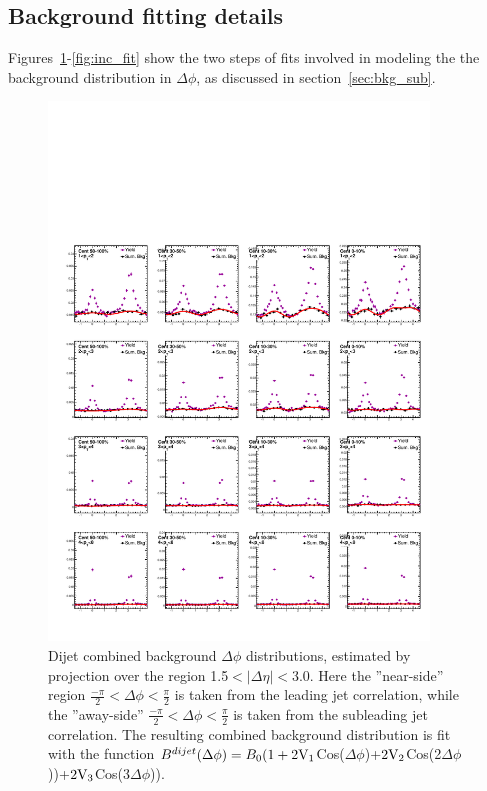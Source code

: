 \clearpage




\subsection{Background fitting details}

\label{app:bkg_fits}

Figures~\ref{fig:dijet_fit}-\ref{fig:inc_fit} show the two steps of fits involved in modeling the the background distribution in $\Delta\phi$, as discussed in section~\ref{sec:bkg_sub}.

\begin{figure}[h!]
\begin{center}
\includegraphics[width=0.9\textwidth]{figures/Appendices/DijetFreeFitsGluedBackgroundV1V2V3.pdf}
\caption[Dijet background fits (preliminary step)]{Dijet combined background $\Delta\phi$ distributions, estimated by projection over the region 1.5$<|\Delta\eta|<$3.0.  Here the ''near-side'' region $\frac{-\pi}{2}<\Delta\phi<\frac{\pi}{2}$ is taken from the leading jet correlation, while the ''away-side'' $\frac{-\pi}{2}<\Delta\phi<\frac{\pi}{2}$ is taken from the subleading jet correlation.  The resulting combined background distribution is fit with the function $B^{dijet}(\Delta\phi) = B_{0}(1+2\rm{V}_{1}$Cos($\Delta\phi$)+$2\rm{V}_{2}$Cos(2$\Delta\phi$))+$2\rm{V}_{3}$Cos(3$\Delta\phi$)).}
\label{fig:dijet_fit}
\end{center}
\end{figure}


